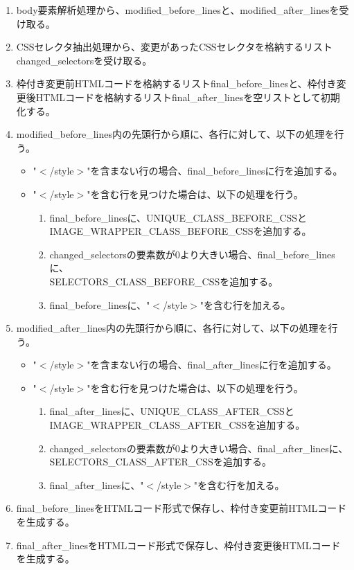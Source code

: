 \begin{enumerate}
    \item body要素解析処理から、modified\_before\_linesと、modified\_after\_linesを受け取る。
    \item CSSセレクタ抽出処理から、変更があったCSSセレクタを格納するリストchanged\_selectorsを受け取る。
    \item 枠付き変更前HTMLコードを格納するリストfinal\_before\_linesと、枠付き変更後HTMLコードを格納するリストfinal\_after\_linesを空リストとして初期化する。
    \item modified\_before\_lines内の先頭行から順に、各行に対して、以下の処理を行う。
          \begin{itemize}
              \item "$<$/style$>$"を含まない行の場合、final\_before\_linesに行を追加する。
              \item "$<$/style$>$"を含む行を見つけた場合は、以下の処理を行う。
                    \begin{enumerate}
                        \item final\_before\_linesに、UNIQUE\_CLASS\_BEFORE\_CSSと\\IMAGE\_WRAPPER\_CLASS\_BEFORE\_CSSを追加する。
                        \item changed\_selectorsの要素数が$0$より大きい場合、final\_before\_linesに、\\SELECTORS\_CLASS\_BEFORE\_CSSを追加する。
                        \item final\_before\_linesに、"$<$/style$>$"を含む行を加える。
                    \end{enumerate}
          \end{itemize}
    \item modified\_after\_lines内の先頭行から順に、各行に対して、以下の処理を行う。
          \begin{itemize}
              \item "$<$/style$>$"を含まない行の場合、final\_after\_linesに行を追加する。
              \item "$<$/style$>$"を含む行を見つけた場合は、以下の処理を行う。
                    \begin{enumerate}
                        \item final\_after\_linesに、UNIQUE\_CLASS\_AFTER\_CSSと\\IMAGE\_WRAPPER\_CLASS\_AFTER\_CSSを追加する。
                        \item changed\_selectorsの要素数が$0$より大きい場合、final\_after\_linesに、\\SELECTORS\_CLASS\_AFTER\_CSSを追加する。
                        \item final\_after\_linesに、"$<$/style$>$"を含む行を加える。
                    \end{enumerate}
          \end{itemize}
    \item final\_before\_linesをHTMLコード形式で保存し、枠付き変更前HTMLコードを生成する。
    \item final\_after\_linesをHTMLコード形式で保存し、枠付き変更後HTMLコードを生成する。
\end{enumerate}
